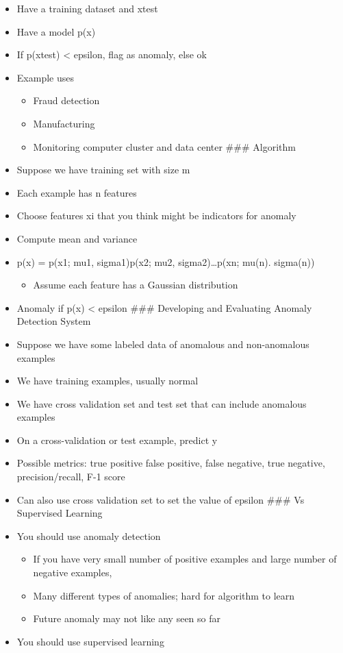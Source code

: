 \documentclass[]{article}
\providecommand{\tightlist}{%
  \setlength{\itemsep}{0pt}\setlength{\parskip}{0pt}}
\begin{document}
\begin{itemize}
\tightlist
\item
  Have a training dataset and xtest
\item
  Have a model p(x)
\item
  If p(xtest) \textless{} epsilon, flag as anomaly, else ok
\item
  Example uses

  \begin{itemize}
  \tightlist
  \item
    Fraud detection
  \item
    Manufacturing
  \item
    Monitoring computer cluster and data center \#\#\# Algorithm
  \end{itemize}
\item
  Suppose we have training set with size m
\item
  Each example has n features
\item
  Choose features xi that you think might be indicators for anomaly
\item
  Compute mean and variance
\item
  p(x) = p(x1; mu1, sigma1)p(x2; mu2, sigma2)\ldots{}p(xn; mu(n).
  sigma(n))

  \begin{itemize}
  \tightlist
  \item
    Assume each feature has a Gaussian distribution
  \end{itemize}
\item
  Anomaly if p(x) \textless{} epsilon \#\#\# Developing and Evaluating
  Anomaly Detection System
\item
  Suppose we have some labeled data of anomalous and non-anomalous
  examples
\item
  We have training examples, usually normal
\item
  We have cross validation set and test set that can include anomalous
  examples
\item
  On a cross-validation or test example, predict y
\item
  Possible metrics: true positive false positive, false negative, true
  negative, precision/recall, F-1 score
\item
  Can also use cross validation set to set the value of epsilon \#\#\#
  Vs Supervised Learning
\item
  You should use anomaly detection

  \begin{itemize}
  \tightlist
  \item
    If you have very small number of positive examples and large number
    of negative examples,
  \item
    Many different types of anomalies; hard for algorithm to learn
  \item
    Future anomaly may not like any seen so far
  \end{itemize}
\item
  You should use supervised learning


\end{itemize}
\end{document}
